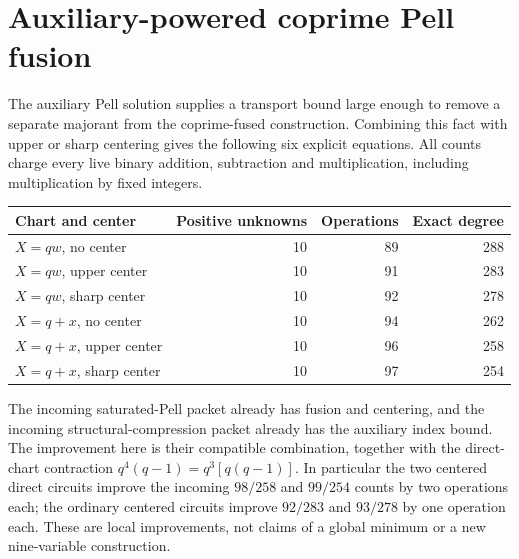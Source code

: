 \section{Auxiliary-powered coprime Pell fusion}
\label{sec:aux-fused}
The auxiliary Pell solution supplies a transport bound large enough to remove a separate majorant from the coprime-fused construction. Combining this fact with upper or sharp centering gives the following six explicit equations. All counts charge every live binary addition, subtraction and multiplication, including multiplication by fixed integers.
\begin{center}
\begin{tabular}{lrrr}
Chart and center & Positive unknowns & Operations & Exact degree\\\hline
$X=qw$, no center &10&89&288\\
$X=qw$, upper center &10&91&283\\
$X=qw$, sharp center &10&92&278\\
$X=q+x$, no center &10&94&262\\
$X=q+x$, upper center &10&96&258\\
$X=q+x$, sharp center &10&97&254
\end{tabular}
\end{center}
The incoming saturated-Pell packet already has fusion and centering, and the incoming structural-compression packet already has the auxiliary index bound. The improvement here is their compatible combination, together with the direct-chart contraction $q^4(q-1)=q^3[q(q-1)]$. In particular the two centered direct circuits improve the incoming $98/258$ and $99/254$ counts by two operations each; the ordinary centered circuits improve $92/283$ and $93/278$ by one operation each. These are local improvements, not claims of a global minimum or a new nine-variable construction.

